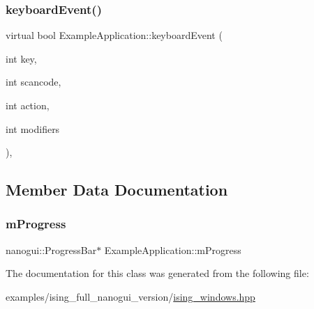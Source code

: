 \mbox{\label{classExampleApplication_a79821271b7d486f2727c42ad9d385ba4}} 
\subsubsection{\texorpdfstring{keyboard\+Event()}{keyboardEvent()}}
{\footnotesize\ttfamily virtual bool Example\+Application\+::keyboard\+Event (\begin{DoxyParamCaption}\item[{int}]{key,  }\item[{int}]{scancode,  }\item[{int}]{action,  }\item[{int}]{modifiers }\end{DoxyParamCaption})\hspace{0.3cm}{\ttfamily [inline]}, {\ttfamily [virtual]}}



\subsection{Member Data Documentation}
\mbox{\label{classExampleApplication_a0f3364dd56cbc31539b750aebd0c6a5a}} 
\subsubsection{\texorpdfstring{m\+Progress}{mProgress}}
{\footnotesize\ttfamily nanogui\+::\+Progress\+Bar$\ast$ Example\+Application\+::m\+Progress\hspace{0.3cm}{\ttfamily [private]}}



The documentation for this class was generated from the following file\+:\begin{DoxyCompactItemize}
\item 
examples/ising\+\_\+full\+\_\+nanogui\+\_\+version/\mbox{\hyperlink{ising__full__nanogui__version_2ising__windows_8hpp}{ising\+\_\+windows.\+hpp}}\end{DoxyCompactItemize}
